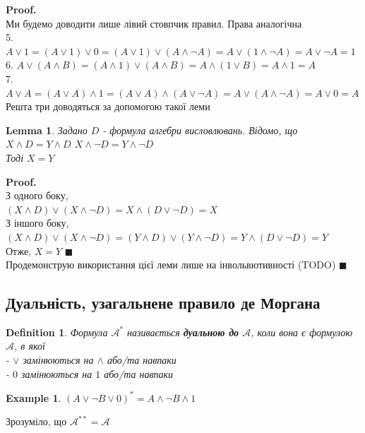 \documentclass[a4paper, 14pt]{extarticle}
\theoremstyle{theoremdd}
\theoremstyle{theoremdd}
\newtheorem{definition}[theorem]{Definition}
\theoremstyle{theoremdd}
\theoremstyle{theoremdd}
\newtheorem{example}[theorem]{Example}
\theoremstyle{theoremdd}
\theoremstyle{theoremdd}
\theoremstyle{theoremdd}
\newtheorem{lemma}[theorem]{Lemma}
\theoremstyle{theoremdd}
\newenvironment{pf}{\vspace*{-3mm} \textbf{Proof. \\}}{$\blacksquare$}
\newenvironment{pfNoTh}{\textbf{Proof. \\}}{$\blacksquare$}
\begin{document}
\begin{pfNoTh}
Ми будемо доводити лише лівий стовпчик правил. Права аналогічна\\
5. $A \vee 1 = (A \vee 1) \vee 0 = (A \vee 1) \vee (A \wedge \neg A) = A \vee (1 \wedge \neg A) = A \vee \neg A = 1$
\bigskip \\
6. $A \vee (A \wedge B) = (A \wedge 1) \vee (A \wedge B) = A \wedge (1 \vee B) = A \wedge 1 = A$
\bigskip \\
7. $A \vee A = (A \vee A) \wedge 1 = (A \vee A) \wedge (A \vee \neg A) = A \vee (A \wedge \neg A) = A \vee 0 = A$
\bigskip \\
Решта три доводяться за допомогою такої леми
\begin{lemma}
Задано $D$ - формула алгебри висловлювань. Відомо, що\\
$X \wedge D = Y \wedge D$ \hspace{1cm} $X \wedge \neg D = Y \wedge \neg D$\\
Тоді $X=Y$
\end{lemma}
\begin{pf}
З одного боку,\\
$(X \wedge D) \vee (X \wedge \neg D) = X \wedge (D \vee \neg D) = X$\\
З іншого боку,\\
$(X \wedge D) \vee (X \wedge \neg D) = (Y \wedge D) \vee (Y \wedge \neg D) = Y \wedge (D \vee \neg D) = Y$\\
Отже, $X=Y$
\end{pf}
\bigskip \\
Продемонструю використання цієї леми лише на інвольвютивності (TODO)
\end{pfNoTh}

\subsection{Дуальність, узагальнене правило де Моргана}
\begin{definition}
Формула $\mathcal{A}^*$ називається \textbf{дуальною до} $\mathcal{A}$, коли вона є формулою $\mathcal{A}$, в якої\\
- $\vee$ замінюються на $\wedge$ або/та навпаки\\
- $0$ замінюються на $1$ або/та навпаки
\end{definition}

\begin{example}
$(A \vee \neg B \vee 0)^* = A \wedge \neg B \wedge 1$
\end{example}
Зрозуміло, що $\mathcal{A}^{**} = \mathcal{A}$
\end{document}
